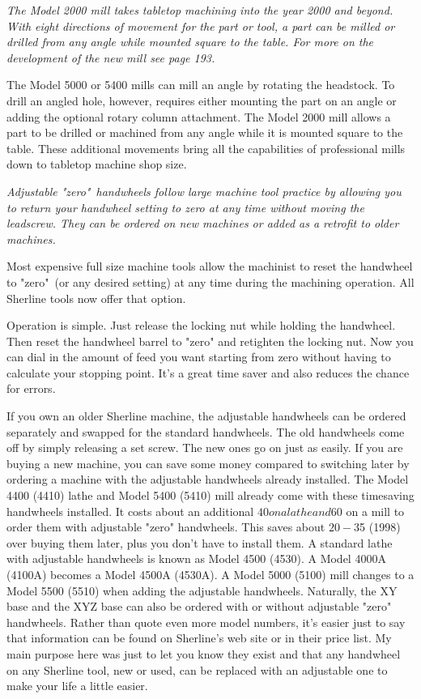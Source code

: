 \bigskip
\textit{The Model 2000 mill takes tabletop machining into the year 2000 and
beyond. With eight directions of movement for the part or tool, a part can be
milled or drilled from any angle while mounted square to the table. For more on
the development of the new mill see page 193.}
\bigskip

The Model 5000 or 5400 mills can mill an angle by rotating the headstock. To
drill an angled hole, however, requires either mounting the part on an angle or
adding the optional rotary column attachment. The Model 2000 mill allows a part
to be drilled or machined from any angle while it is mounted square to the
table. These additional movements bring all the capabilities of professional
mills down to tabletop machine shop size.

\bigskip
\textit{Adjustable "zero"\ handwheels follow large machine tool practice by
allowing you to return your handwheel setting to zero at any time without moving
the leadscrew. They can be ordered on new machines or added as a retrofit to
older machines.}
\bigskip


Most expensive full size machine tools allow the machinist to reset the
handwheel to "zero"\ (or any desired setting) at any time during the machining
operation. All Sherline tools now offer that option.

Operation is simple. Just release the locking nut while holding the handwheel.
Then reset the handwheel barrel to "zero" and retighten the locking nut. Now you
can dial in the amount of feed you want starting from zero without having to
calculate your stopping point. It's a great time saver and also reduces the
chance for errors.

If you own an older Sherline machine, the adjustable handwheels can be ordered
separately and swapped for the standard handwheels. The old handwheels come off
by simply releasing a set screw. The new ones go on just as easily. If you are
buying a new machine, you can save some money compared to switching later by
ordering a machine with the adjustable handwheels already installed. The Model
4400 (4410) lathe and Model 5400 (5410) mill already come with these timesaving
handwheels installed. It costs about an additional $40 on a lathe and $60 on a
mill to order them with adjustable "zero" handwheels. This saves about $20-$35
(1998) over buying them later, plus you don't have to install them. A standard
lathe with adjustable handwheels is known as Model 4500 (4530). A Model 4000A
(4100A) becomes a Model 4500A (4530A). A Model 5000 (5100) mill changes to a
Model 5500 (5510) when adding the adjustable handwheels. Naturally, the XY base
and the XYZ base can also be ordered with or without adjustable "zero"
handwheels. Rather than quote even more model numbers, it's easier just to say
that information can be found on Sherline's web site or in their price list. My
main purpose here was just to let you know they exist and that any handwheel on
any Sherline tool, new or used, can be replaced with an adjustable one to make
your life a little easier.

